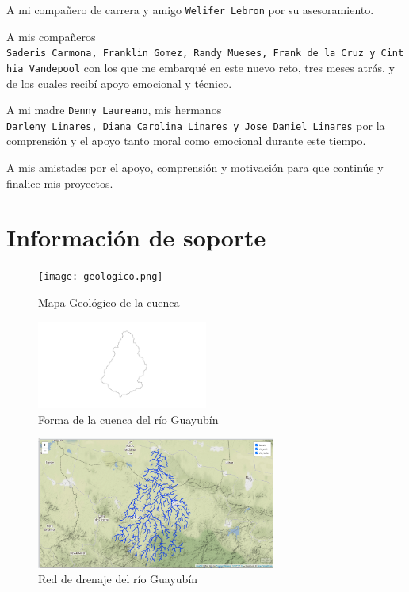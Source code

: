 \documentclass[11pt,]{article}
\begin{document}
A mi compañero de carrera y amigo \texttt{Welifer\ Lebron} por su
asesoramiento.

A mis compañeros
\texttt{Saderis\ Carmona,\ Franklin\ Gomez,\ Randy\ Mueses,\ Frank\ de\ la\ Cruz\ y\ Cinthia\ Vandepool}
con los que me embarqué en este nuevo reto, tres meses atrás, y de los
cuales recibí apoyo emocional y técnico.

A mi madre \texttt{Denny\ Laureano}, mis hermanos
\texttt{Darleny\ Linares,\ Diana\ Carolina\ Linares\ y\ Jose\ Daniel\ Linares}
por la comprensión y el apoyo tanto moral como emocional durante este
tiempo.

A mis amistades por el apoyo, comprensión y motivación para que continúe
y finalice mis proyectos.

\section{Información de soporte}\label{informaciuxf3n-de-soporte}

\begin{figure}
\centering
\texttt{[image: geologico.png]}
\caption{Mapa Geológico de la cuenca\label{geologico}}
\end{figure}

\begin{figure}
\centering
\includegraphics[width=0.50000\textwidth]{cuenca extraida.png}
\caption{Forma de la cuenca del río Guayubín\label{forma}}
\end{figure}

\begin{figure}
\centering
\includegraphics[width=0.70000\textwidth]{red de drenaje extraida.png}
\caption{Red de drenaje del río Guayubín\label{red de drenaje extraida}}
\end{figure}
\end{document}
